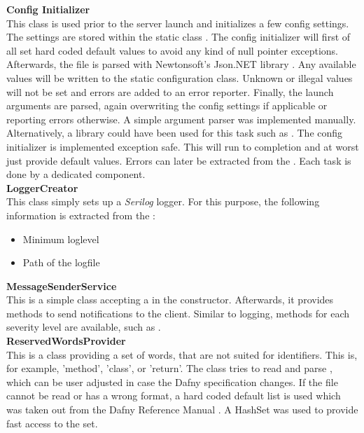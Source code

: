 \textbf{Config Initializer}\\
This class is used prior to the server launch and initializes a few config settings.
The settings are stored within the static class .
The config initializer will first of all set hard coded default values to avoid any kind of null pointer exceptions.
Afterwards, the file  is parsed with Newtonsoft's Json.NET library \cite{jsondotnet}.
Any available values will be written to the static configuration class.
Unknown or illegal values will not be set and errors are added to an error reporter.
Finally, the launch arguments are parsed, again overwriting the config settings if applicable or reporting errors otherwise.
A simple argument parser was implemented manually.
Alternatively, a library could have been used for this task such as \cite{clparser}.
The config initializer is implemented exception safe.
This will run to completion and at worst just provide default values.
Errors can later be extracted from the .
Each task is done by a dedicated component.\\

\textbf{LoggerCreator}\\
This class simply sets up a \textit{Serilog} \cite{serilog} logger.
For this purpose, the following information is extracted from the :
\begin{itemize}
    \item Minimum loglevel
    \item Path of the logfile
\end{itemize}

\textbf{MessageSenderService}\\
This is a simple class accepting a  in the constructor.
Afterwards, it provides methods to send notifications to the client.
Similar to logging, methods for each severity level are available, such as .\\

\textbf{ReservedWordsProvider}\\
This is a class providing a set of words, that are not suited for identifiers.
This is, for example, 'method', 'class', or 'return'.
The class tries to read and parse , which can be user adjusted in case the Dafny specification changes.
If the file cannot be read or has a wrong format, a hard coded default list is used which was taken out from the Dafny Reference Manual \cite{dafnyReferenceManual}.
A HashSet was used to provide fast access to the set.\\

